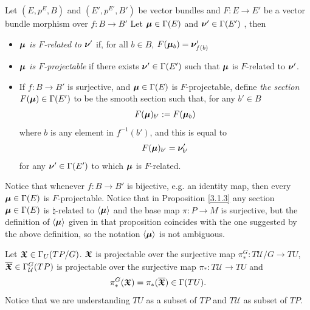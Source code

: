 \begin{definition}\label{defnRelatedProjectable}
Let $(E, p^E, B)$ and $(E', p^{E'}, B')$ be vector bundles and $F: E \to E'$ be a vector bundle morphism over $f: B \to B'$ Let $\bm{\mu} \in \Gamma(E)$ and $\bm{\nu}' \in \Gamma(E')$ , then
    \begin{itemize}
        
    \item \emph{$\bm{\mu}$ is $F$-related to $\bm{\nu}'$} if, for all $b \in B$, $F(\bm{\mu}_b) = \bm{\nu}'_{f(b)}$
    
    \item \emph{$\bm{\mu}$ is $F$-projectable} if there exists $\bm{\nu}' \in \Gamma(E')$ such that $\bm{\mu}$ is $F$-related to $\bm{\nu}'$.
    
    \item If $f:B \to B'$ is surjective, and $\bm{\mu} \in \Gamma(E)$ is $F$-projectable, define \emph{the section $F(\bm{\mu}) \in \Gamma(E')$} to be the smooth section such that, for any $b' \in B$
    \begin{align} \label{funOfSection}
        F(\bm{\mu})_{b'} := F(\bm{\mu}_b)
    \end{align} where $b$ is any element in $f^{-1}(b')$, and this is equal to \[F(\bm{\mu})_{b'} = \bm{\nu}'_{b'}\] for any $\bm{\nu}' \in \Gamma(E')$ to which $\bm{\mu}$ is $F$-related.
    
    \end{itemize}

Notice that whenever $f: B \to B'$ is bijective, e.g. an identity map, then every $\bm{\mu} \in \Gamma(E)$ is $F$-projectable. Notice that in Proposition \ref{3.1.3} any section $\bm{\mu} \in \Gamma(E)$ is $\natural$-related to $\left\langle \bm{\mu} \right\rangle$ and the base map $\pi:P \to M$ is surjective, but the definition of $\left\langle \bm{\mu} \right\rangle$ given in that proposition coincides with the one suggested by the above definition, so the notation $\left\langle \bm{\mu} \right\rangle$ is not ambiguous.

\end{definition}

\begin{theorem} \label{theoAnchorUpsect}
Let $\bm{\mathfrak{X}} \in \Gamma_U(TP/G)$. $\bm{\mathfrak{X}}$ is projectable over the surjective map $\pi_*^G: T\mathcal U/G \to TU$, $\overline{\bm{\bm{\mathfrak{X}}}} \in \Gamma^G_{\mathcal U}(TP)$ is projectable over the surjective map $\pi_*: T\mathcal U \to TU$ and
\begin{align} \label{theoAnchorUpsectEqn}
    \pi^G_*(\bm{\mathfrak{X}}) = \pi_*(\overline{\bm{\bm{\mathfrak{X}}}}) \in \Gamma(TU).
\end{align}
Notice that we are understanding $TU$ as a subset of $TP$ and $T\mathcal U$ as subset of $TP$.
\end{theorem}

